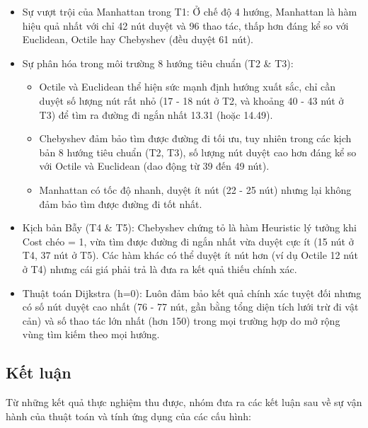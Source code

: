 \documentclass[12pt,a4paper]{report}
\begin{document}
\begin{itemize}
\begin{itemize}
    \item Sự vượt trội của Manhattan trong T1: Ở chế độ 4 hướng, Manhattan là hàm hiệu quả nhất với chỉ 42 nút duyệt và 96 thao tác, thấp hơn đáng kể so với Euclidean, Octile hay Chebyshev (đều duyệt 61 nút).
    \item Sự phân hóa trong môi trường 8 hướng tiêu chuẩn (T2 \& T3):
    \begin{itemize}
        \item Octile và Euclidean thể hiện sức mạnh định hướng xuất sắc, chỉ cần duyệt số lượng nút rất nhỏ (17 - 18 nút ở T2, và khoảng 40 - 43 nút ở T3) để tìm ra đường đi ngắn nhất 13.31 (hoặc 14.49). 
        \item Chebyshev đảm bảo tìm được đường đi tối ưu, tuy nhiên trong các kịch bản 8 hướng tiêu chuẩn (T2, T3), số lượng nút duyệt cao hơn đáng kể so với Octile và Euclidean (dao động từ 39 đến 49 nút).
        \item Manhattan có tốc độ nhanh, duyệt ít nút (22 - 25 nút) nhưng lại không đảm bảo tìm được đường đi tốt nhất.
    \end{itemize}
    \item Kịch bản Bẫy (T4 \& T5): Chebyshev chứng tỏ là hàm Heuristic lý tưởng khi Cost chéo = 1, vừa tìm được đường đi ngắn nhất vừa duyệt cực ít (15 nút ở T4, 37 nút ở T5). Các hàm khác có thể duyệt ít nút hơn (ví dụ Octile 12 nút ở T4) nhưng cái giá phải trả là đưa ra kết quả thiếu chính xác.
    \item Thuật toán Dijkstra (h=0): Luôn đảm bảo kết quả chính xác tuyệt đối nhưng có số nút duyệt cao nhất (76 - 77 nút, gần bằng tổng diện tích lưới trừ đi vật cản) và số thao tác lớn nhất (hơn 150) trong mọi trường hợp do mở rộng vùng tìm kiếm theo mọi hướng.
\end{itemize}
\end{itemize}
\subsection{Kết luận}

Từ những kết quả thực nghiệm thu được, nhóm đưa ra các kết luận sau về sự vận hành của thuật toán và tính ứng dụng của các cấu hình:
\end{document}
